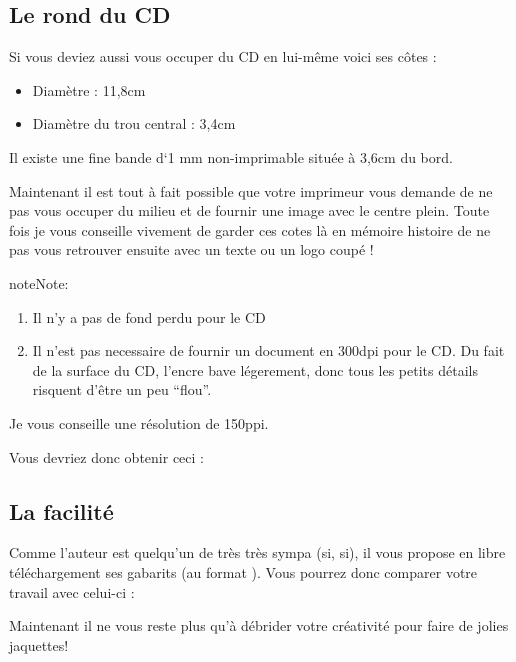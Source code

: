 \documentclass[a4paper,12pt,french]{sphinxmanual}
\begin{document}
\subsection{Le rond du CD}
\label{psd/jaquette_CD:le-rond-du-cd}
Si vous deviez aussi vous occuper du CD en lui-même voici ses côtes :
\begin{itemize}
\item {} 
Diamètre : 11,8cm

\item {} 
Diamètre du trou central : 3,4cm

\end{itemize}

Il existe une fine bande d`1 mm non-imprimable située à 3,6cm du bord.

Maintenant il est tout à fait possible que votre imprimeur vous demande de ne pas vous occuper du milieu et de fournir une image avec le centre plein. Toute fois je vous conseille vivement de garder ces cotes là en mémoire histoire de ne pas vous retrouver ensuite avec un texte ou un logo coupé !

\begin{notice}{note}{Note:}\begin{enumerate}
\item {} 
Il n'y a pas de fond perdu pour le CD

\item {} 
Il n'est pas necessaire de fournir un document en 300dpi pour le CD. Du fait de la surface du CD, l'encre bave légerement, donc tous les petits détails risquent d'être un peu ``flou''.

\end{enumerate}

Je vous conseille une résolution de 150ppi.
\end{notice}

Vous devriez donc obtenir ceci :

\noindent{}


\subsection{La facilité}
\label{psd/jaquette_CD:la-facilite}
Comme l'auteur est quelqu'un de très très sympa (si, si), il vous propose en libre téléchargement ses gabarits (au format ). Vous pourrez donc comparer votre travail avec celui-ci : 

Maintenant il ne vous reste plus qu'à débrider votre créativité pour faire de jolies jaquettes!
\end{document}
